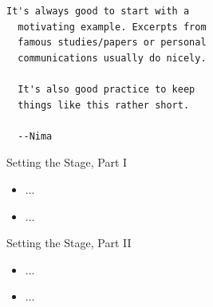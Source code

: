 \documentclass[12pt,t]{beamer}
\begin{document}
\begin{frame}[fragile,c]{}

\begin{center}
\begin{minipage}[c]{9.3cm}
\begin{semiverbatim}
\lstset{basicstyle=\normalsize}
\begin{lstlisting}[linewidth=9.3cm]
  It's always good to start with a
  motivating example. Excerpts from
  famous studies/papers or personal
  communications usually do nicely.

  It's also good practice to keep
  things like this rather short.

  --Nima
\end{lstlisting}
\end{semiverbatim}
\end{minipage}
\end{center}


\end{frame}


\begin{frame}[c]{Setting the Stage, Part I}

\begin{center}
\begin{itemize}
  \item ...
  \item ...
\end{itemize}
\end{center}

\note{
}

\end{frame}


\begin{frame}[c]{Setting the Stage, Part II}

\begin{center}
\begin{itemize}
  \item ...
  \item ...
\end{itemize}
\end{center}

\note{
}

\end{frame}
\end{document}
